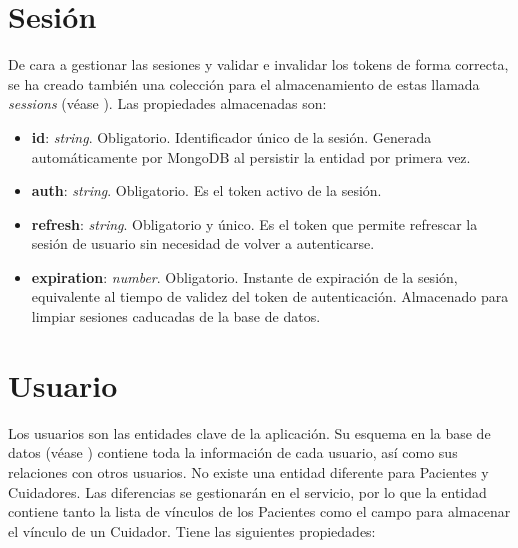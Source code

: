 \section{Sesión}
\label{ssec:sesion}

De cara a gestionar las sesiones y validar e invalidar los \glspl{token} de forma correcta, se ha creado también una colección para el almacenamiento de estas llamada \emph{sessions} (véase ). Las propiedades almacenadas son:

\begin{itemize}
    \item \textbf{id}: \emph{string}. Obligatorio. Identificador único de la sesión. Generada automáticamente por MongoDB al persistir la entidad por primera vez.
    \item \textbf{auth}: \emph{string}. Obligatorio. Es el \gls{token} activo de la sesión.
    \item \textbf{refresh}: \emph{string}. Obligatorio y único. Es el \gls{token} que permite refrescar la sesión de usuario sin necesidad de volver a autenticarse.
    \item \textbf{expiration}: \emph{number}. Obligatorio. Instante de expiración de la sesión, equivalente al tiempo de validez del \gls{token} de autenticación. Almacenado para limpiar sesiones caducadas de la base de datos.
\end{itemize}

\section{Usuario}

Los usuarios son las entidades clave de la aplicación. Su esquema en la base de datos (véase ) contiene toda la información de cada usuario, así como sus relaciones con otros usuarios. No existe una entidad diferente para Pacientes y Cuidadores. Las diferencias se gestionarán en el servicio, por lo que la entidad contiene tanto la lista de vínculos de los Pacientes como el campo para almacenar el vínculo de un Cuidador. Tiene las siguientes propiedades:

